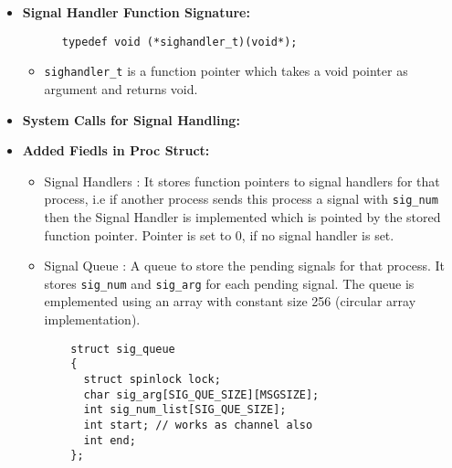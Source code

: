 \documentclass[a4 paper]{article}
\newcommand{\code}[1]{\texttt{#1}}
\begin{document}
\begin{itemize}

\item \textbf{Signal Handler Function Signature:}

\begin{lstlisting}
      typedef void (*sighandler_t)(void*);
\end{lstlisting}

\vspace*{-1.5mm}

\begin{itemize}
\item \texttt{sighandler\_t} is a function pointer which takes a void pointer as argument and returns void.
\end{itemize}

\item \textbf{System Calls for Signal Handling:}

\raggedbottom

\item \textbf{Added Fiedls in Proc Struct:}

\begin{itemize}
  \item Signal Handlers : It stores function pointers to signal handlers for that process, i.e if another process sends this process a signal with \code{sig\_num} then the Signal Handler is implemented which is pointed by the stored function pointer. Pointer is set to 0, if no signal handler is set.
  \item Signal Queue : A queue to store the pending signals for that process. It stores \code{sig\_num} and \code{sig\_arg} for each pending signal. The queue is emplemented using an array with constant size 256 (circular array implementation).

  \begin{lstlisting}
    struct sig_queue
    {
      struct spinlock lock;
      char sig_arg[SIG_QUE_SIZE][MSGSIZE];
      int sig_num_list[SIG_QUE_SIZE];
      int start; // works as channel also
      int end;
    };
  \end{lstlisting}
\end{itemize}


\end{itemize}
\end{document}
